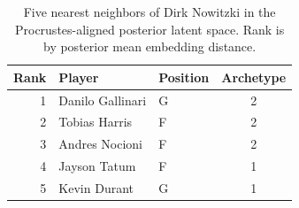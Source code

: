\begin{table}[htbp]
  \centering\small
  \begin{tabular}{rllc}
    \toprule
    Rank & Player & Position & Archetype \\
    \midrule
    1 & Danilo Gallinari & G & 2 \\
    2 & Tobias Harris & F & 2 \\
    3 & Andres Nocioni & F & 2 \\
    4 & Jayson Tatum & F & 1 \\
    5 & Kevin Durant & G & 1 \\
    \bottomrule
  \end{tabular}
  \caption{Five nearest neighbors of Dirk Nowitzki in the Procrustes-aligned posterior latent space. Rank is by posterior mean embedding distance.}
  \label{tab:Dirk_Nowitzki_neighbors}
\end{table}

